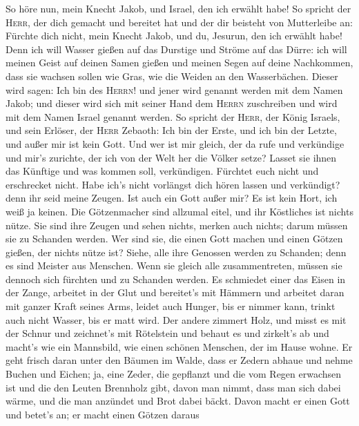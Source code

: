  So höre nun, mein Knecht Jakob, und Israel, den ich
erwählt habe!  So spricht der \textsc{Herr}, der dich
gemacht und bereitet hat und der dir beisteht von Mutterleibe an:
Fürchte dich nicht, mein Knecht Jakob, und du, Jesurun, den ich erwählt
habe!  Denn ich will Wasser gießen auf das Durstige und
Ströme auf das Dürre: ich will meinen Geist auf deinen Samen gießen und
meinen Segen auf deine Nachkommen,  dass sie wachsen
sollen wie Gras, wie die Weiden an den Wasserbächen. 
Dieser wird sagen: Ich bin des \textsc{Herrn}! und jener wird genannt
werden mit dem Namen Jakob; und dieser wird sich mit seiner Hand dem
\textsc{Herrn} zuschreiben und wird mit dem Namen Israel genannt werden.
 So spricht der \textsc{Herr}, der König Israels, und sein
Erlöser, der \textsc{Herr} Zebaoth: Ich bin der Erste, und ich bin der
Letzte, und außer mir ist kein Gott.  Und wer ist mir
gleich, der da rufe und verkündige und mir's zurichte, der ich von der
Welt her die Völker setze? Lasset sie ihnen das Künftige und was kommen
soll, verkündigen.  Fürchtet euch nicht und erschrecket
nicht. Habe ich's nicht vorlängst dich hören lassen und verkündigt? denn
ihr seid meine Zeugen. Ist auch ein Gott außer mir? Es ist kein Hort,
ich weiß ja keinen.  Die Götzenmacher sind allzumal eitel,
und ihr Köstliches ist nichts nütze. Sie sind ihre Zeugen und sehen
nichts, merken auch nichts; darum müssen sie zu Schanden werden.
 Wer sind sie, die einen Gott machen und einen Götzen
gießen, der nichts nütze ist?  Siehe, alle ihre Genossen
werden zu Schanden; denn es sind Meister aus Menschen. Wenn sie gleich
alle zusammentreten, müssen sie dennoch sich fürchten und zu Schanden
werden.  Es schmiedet einer das Eisen in der Zange,
arbeitet in der Glut und bereitet's mit Hämmern und arbeitet daran mit
ganzer Kraft seines Arms, leidet auch Hunger, bis er nimmer kann, trinkt
auch nicht Wasser, bis er matt wird.  Der andere zimmert
Holz, und misst es mit der Schnur und zeichnet's mit Rötelstein und
behaut es und zirkelt's ab und macht's wie ein Mannsbild, wie einen
schönen Menschen, der im Hause wohne.  Er geht frisch
daran unter den Bäumen im Walde, dass er Zedern abhaue und nehme Buchen
und Eichen; ja, eine Zeder, die gepflanzt und die vom Regen erwachsen
ist  und die den Leuten Brennholz gibt, davon man nimmt,
dass man sich dabei wärme, und die man anzündet und Brot dabei bäckt.
Davon macht er einen Gott und betet's an; er macht einen Götzen daraus
